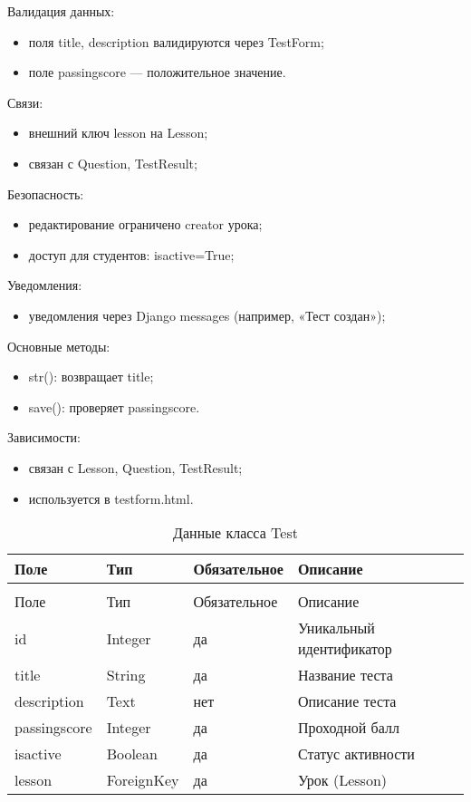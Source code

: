 Валидация данных:
	\begin{itemize}
		\item поля title, description валидируются через TestForm;
		\item поле passingscore — положительное значение.
	\end{itemize}
	
Связи:
	\begin{itemize}
		\item внешний ключ lesson на Lesson;
		\item связан с Question, TestResult;
	\end{itemize}
	
Безопасность:
	\begin{itemize}
		\item редактирование ограничено creator урока;
		\item доступ для студентов: isactive=True;
	\end{itemize}
	
Уведомления:
	\begin{itemize}
		\item уведомления через Django messages (например, «Тест создан»);
	\end{itemize}
	
Основные методы:
	\begin{itemize}
		\item str(): возвращает title;
		\item save(): проверяет passingscore.
	\end{itemize}
	
Зависимости:
	\begin{itemize}
		\item связан с Lesson, Question, TestResult;
		\item используется в testform.html.
	\end{itemize}


\begin{xltabular}{\textwidth}{|l|l|l|X|}
	\caption{Данные класса Test\label{tab:test_attributes}}\\
	\hline
	Поле & Тип & Обязательное & Описание \\ \hline
	\endfirsthead
	\\
	\hline
	Поле & Тип & Обязательное & Описание \\ \hline
	\endhead
	id & Integer & да & Уникальный идентификатор \\ \hline
	title & String & да & Название теста \\ \hline
	description & Text & нет & Описание теста \\ \hline
	passingscore & Integer & да & Проходной балл \\ \hline
	isactive & Boolean & да & Статус активности \\ \hline
	lesson & ForeignKey & да & Урок (Lesson) \\ \hline
\end{xltabular}

